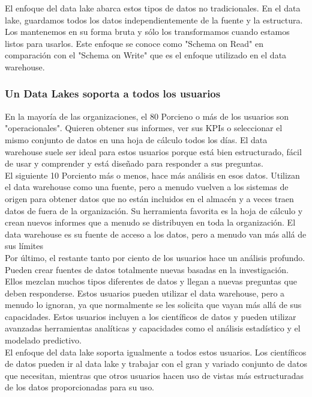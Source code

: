 \documentclass[preprint,12pt]{elsarticle}
\begin{document}
El enfoque del data lake abarca estos tipos de datos no tradicionales. En el data lake, guardamos todos los datos independientemente de la fuente y la estructura. Los mantenemos en su forma bruta y sólo los transformamos cuando estamos listos para usarlos. Este enfoque se conoce como "Schema on Read" en comparación con el "Schema on Write" que es el enfoque utilizado en el data warehouse.\\

\subsubsection{Un Data Lakes soporta a todos los usuarios}

En la mayoría de las organizaciones, el 80 Porcieno o más de los usuarios son "operacionales". Quieren obtener sus informes, ver sus KPIs o seleccionar el mismo conjunto de datos en una hoja de cálculo todos los días. El data warehouse suele ser ideal para estos usuarios porque está bien estructurado, fácil de usar y comprender y está diseñado para responder a sus preguntas.\\

El siguiente 10 Porciento más o menos, hace más análisis en esos datos. Utilizan el data warehouse como una fuente, pero a menudo vuelven a los sistemas de origen para obtener datos que no están incluidos en el almacén y a veces traen datos de fuera de la organización. Su herramienta favorita es la hoja de cálculo y crean nuevos informes que a menudo se distribuyen en toda la organización. El data warehouse es su fuente de acceso a los datos, pero a menudo van más allá de sus límites\\

Por último, el restante tanto por ciento de los usuarios hace un análisis profundo. Pueden crear fuentes de datos totalmente nuevas basadas en la investigación. Ellos mezclan muchos tipos diferentes de datos y llegan a nuevas preguntas que deben responderse. Estos usuarios pueden utilizar el data warehouse, pero a menudo lo ignoran, ya que normalmente se les solicita que vayan más allá de sus capacidades. Estos usuarios incluyen a los científicos de datos y pueden utilizar avanzadas herramientas analíticas y capacidades como el análisis estadístico y el modelado predictivo.\\

El enfoque del data lake soporta igualmente a todos estos usuarios. Los científicos de datos pueden ir al data lake y trabajar con el gran y variado conjunto de datos que necesitan, mientras que otros usuarios hacen uso de vistas más estructuradas de los datos proporcionadas para su uso.\\
\end{document}
